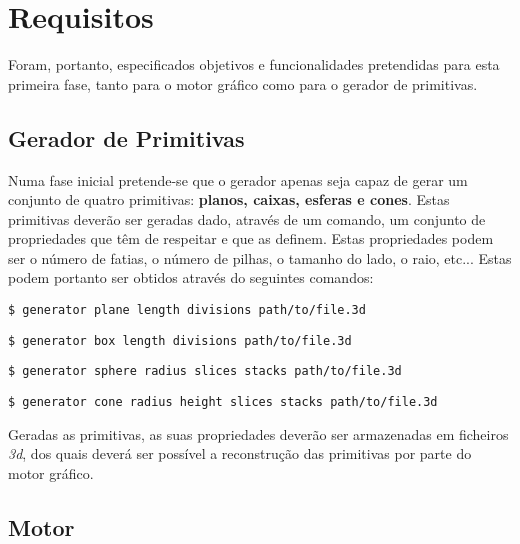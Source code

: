 \section{Requisitos}

Foram, portanto, especificados objetivos e funcionalidades pretendidas
para esta primeira fase, tanto para o motor gráfico como para o gerador
de primitivas.

\subsection{Gerador de Primitivas}

Numa fase inicial pretende-se que o gerador apenas seja capaz de gerar um
conjunto de quatro primitivas: \textbf{planos, caixas, esferas e cones}.
\newline
\break
\noindent
Estas primitivas deverão ser geradas dado, através de um comando,
um conjunto de propriedades que têm de respeitar e que as definem. Estas
propriedades podem ser o número de fatias, o número de pilhas, o tamanho
do lado, o raio, etc...\newline
\break
\noindent
Estas podem portanto ser obtidos através do seguintes comandos:

\begin{lstlisting}[style=BASH]
    $ generator plane length divisions path/to/file.3d
\end{lstlisting}

\begin{lstlisting}[style=BASH]
    $ generator box length divisions path/to/file.3d
\end{lstlisting}

\begin{lstlisting}[style=BASH]
    $ generator sphere radius slices stacks path/to/file.3d
\end{lstlisting}

\begin{lstlisting}[style=BASH]
    $ generator cone radius height slices stacks path/to/file.3d
\end{lstlisting}

\break
\noindent
Geradas as primitivas, as suas propriedades deverão ser armazenadas em
ficheiros \textit{3d}, dos quais deverá ser possível a reconstrução das
primitivas por parte do motor gráfico.

\subsection{Motor}

